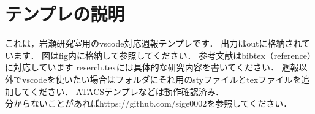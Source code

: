 \section{テンプレの説明}
これは，岩瀬研究室用のvscode対応週報テンプレです．
出力はoutに格納されています．
図はfig内に格納して参照してください．
参考文献はbibtex（reference）に対応しています\cite{1}
reserch.texには具体的な研究内容を書いてください．
週報以外でvscodeを使いたい場合はフォルダにそれ用のstyファイルとtexファイルを追加してください．
ATACSテンプレなどは動作確認済み．\\
分からないことがあればhttps://github.com/sige0002を参照してください．


